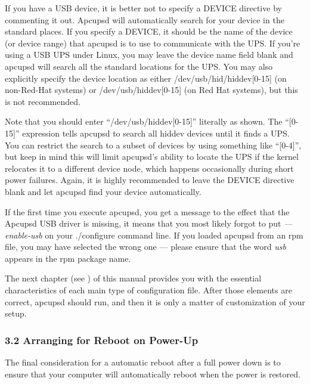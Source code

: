 If you have a USB device, it is better not to specify a DEVICE directive by
commenting it out. Apcupsd will automatically search for your device in the
standard places. If you specify a DEVICE, it should be the name of the device
(or device range) that apcupsd is to use to communicate with the UPS.  If
you're using a USB UPS under Linux, you may leave the device name field blank
and apcupsd will search all the standard locations for the UPS. You may also
explicitly specify the device location as either /dev/usb/hid/hiddev[0-15] (on
non-Red-Hat systems) or /dev/usb/hiddev[0-15] (on Red Hat systems), but this
is not recommended.  

Note that you should enter ``/dev/usb/hiddev[0-15]'' literally as shown.  The
``[0-15]'' expression tells apcupsd to search all hiddev devices until it
finds a UPS. You can restrict the search to a subset of devices by using
something like ``[0-4]'', but keep in mind this will limit apcupsd's ability
to locate the UPS if the kernel relocates it to a different device node, which
happens occasionally during short power failures. Again, it is highly
recommended to leave the DEVICE directive blank and let apcupsd find your
device automatically.  

If the first time you execute apcupsd, you get a message to the effect that
the Apcupsd USB driver is missing, it means that you most likely forgot to put
{\it {---}enable-usb} on your ./configure command line. If you loaded apcupsd
from an rpm file, you may have selected the wrong one {---} please ensure that
the word {\it usb} appears in the rpm package name.  

The next chapter (see 
) of this
manual provides you with the essential characteristics of each main type of
configuration file.  After those elements are correct, apcupsd should run, and
then it is only a matter of customization of your setup. 

\label{Arranging-for-Reboot-on-Power_002dUp}

\subsubsection*{3.2 Arranging for Reboot on Power-Up}

\label{index-Reboot-on-power-up-60}
\label{index-Power-up_002c-reboot-61}
The final consideration for a automatic reboot after a full power down is to
ensure that your computer will automatically reboot when the power is
restored.  


